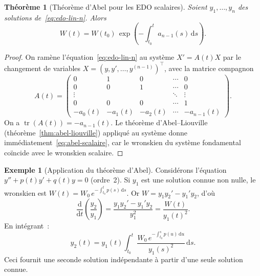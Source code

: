\documentclass[12pt,a4paper,openany]{book}
\theoremstyle{definition}
\newtheorem{exemple}[definition]{Exemple}
\theoremstyle{plain}
\newtheorem{theoreme}[definition]{Théorème}
\theoremstyle{remark}
\newcommand{\dd}{\mathrm{d}}
\DeclareMathOperator{\tr}{tr}
\begin{document}
\begin{theoreme}[Théorème d'Abel pour les EDO scalaires]\label{thm:abel-scalaire}
  Soient $y_1,\ldots,y_n$ des solutions de~\eqref{eq:edo-lin-n}. Alors
  \begin{equation}\label{eq:abel-scalaire}
    W(t) = W(t_0)\,\exp\!\left(-\int_{t_0}^t a_{n-1}(s)\,\dd s\right).
  \end{equation}
\end{theoreme}

\begin{proof}
  On ramène l'équation~\eqref{eq:edo-lin-n} au système $X' = A(t)X$
  par le changement de variables $X = (y, y', \ldots, y^{(n-1)})^\top$,
  avec la matrice compagnon
  \[
    A(t) = \begin{pmatrix}
      0 & 1 & 0 & \cdots & 0 \\
      0 & 0 & 1 & \cdots & 0 \\
      \vdots & & & \ddots & \vdots \\
      0 & 0 & 0 & \cdots & 1 \\
      -a_0(t) & -a_1(t) & -a_2(t) & \cdots & -a_{n-1}(t)
    \end{pmatrix}.
  \]
  On a $\tr(A(t)) = -a_{n-1}(t)$. Le théorème d'Abel--Liouville
  (théorème~\ref{thm:abel-liouville}) appliqué au système donne
  immédiatement~\eqref{eq:abel-scalaire}, car le wronskien du système
  fondamental coïncide avec le wronskien scalaire.
\end{proof}

\begin{exemple}[Application du théorème d'Abel]\label{ex:abel-application}
  Considérons l'équation $y'' + p(t)y' + q(t)y = 0$ (ordre~2).
  Si $y_1$ est une solution connue non nulle, le wronskien est
  $W(t) = W_0\,e^{-\int_{t_0}^t p(s)\,\dd s}$.
  Or $W = y_1 y_2' - y_1' y_2$, d'où
  \[
    \frac{\dd}{\dd t}\!\left(\frac{y_2}{y_1}\right)
    = \frac{y_1 y_2' - y_1' y_2}{y_1^2}
    = \frac{W(t)}{y_1(t)^2}.
  \]
  En intégrant~:
  \begin{equation}\label{eq:2e-solution-abel}
    y_2(t) = y_1(t)\int_{t_0}^t \frac{W_0\,e^{-\int_{t_0}^s p(u)\,\dd u}}
    {y_1(s)^2}\,\dd s.
  \end{equation}
  Ceci fournit une seconde solution indépendante à partir d'une seule
  solution connue.
\end{exemple}

\end{document}

